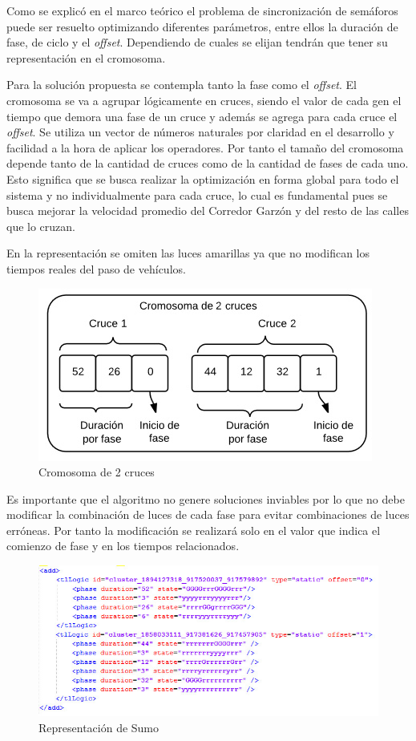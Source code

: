 Como se explicó en el marco teórico el problema de sincronización de semáforos puede ser resuelto optimizando diferentes parámetros, entre ellos la duración de fase, de ciclo y el \emph{offset}. Dependiendo de cuales se elijan tendrán que tener su representación en el cromosoma.

Para la solución propuesta se contempla tanto la fase como el \emph{offset}. El cromosoma se va a  agrupar  lógicamente en cruces, siendo el valor de cada gen el tiempo que demora una
fase de un cruce y además se agrega para cada cruce el \emph{offset}. Se utiliza un vector de números naturales por claridad en el desarrollo y facilidad a la hora de aplicar los operadores.
Por tanto el tamaño del cromosoma depende tanto de la cantidad de cruces como de la cantidad de fases de cada uno. Esto significa que se busca realizar la optimización en forma global para todo el sistema y no individualmente para cada cruce, lo cual es fundamental pues se busca mejorar la velocidad promedio del Corredor Garzón y del resto de las calles que lo cruzan.

En la representación se omiten las luces amarillas ya que no modifican los tiempos reales del paso de vehículos.
 
 \begin{figure}[h]
 	\centering
 	\includegraphics[width=0.7\linewidth]{Figures/cromosoma1}
 	\caption{Cromosoma de 2 cruces}
 	\label{fig:cromosoma1}
 \end{figure}
 
Es  importante que el algoritmo no genere soluciones inviables por lo que no debe modificar la combinación de luces de cada fase para evitar combinaciones de luces erróneas. Por tanto la modificación se realizará solo en el valor que indica el comienzo de fase y en los tiempos relacionados.

\begin{figure}[H]
	\centering
	\includegraphics[width=\linewidth]{Figures/rep_sumo2}
	\caption{Representación de Sumo}
	\label{fig:rep_sumo}
\end{figure}

